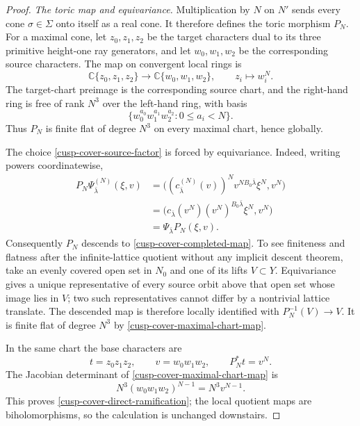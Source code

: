 \begin{proof}
\medskip\noindent
\emph{The toric map and equivariance.}
Multiplication by $N$ on $N'$ sends every cone $\sigma\in\Sigma$ onto
itself as a real cone.  It therefore defines the toric morphism $P_N$.
For a maximal cone, let $z_0,z_1,z_2$ be the target characters dual to its
three primitive height-one ray generators, and let $w_0,w_1,w_2$ be the
corresponding source characters.  The map on convergent local rings is
\begin{equation}
 \mathbb C\{z_0,z_1,z_2\}\longrightarrow
\mathbb C\{w_0,w_1,w_2\},\qquad z_i\longmapsto w_i^N.
 \label{cusp-cover-maximal-chart-map}
\end{equation}
The target-chart preimage is the corresponding source chart, and the
right-hand ring is free of rank $N^3$ over the left-hand ring, with basis
\[
 \{w_0^{a_0}w_1^{a_1}w_2^{a_2}:0\le a_i<N\}.
\]
Thus $P_N$ is finite flat of degree $N^3$ on every maximal chart, hence
globally.

The choice \eqref{cusp-cover-source-factor} is forced by equivariance.
Indeed, writing powers coordinatewise,
\begin{align}
 P_N\Psi^{(N)}_{\bar\lambda}(\xi,v)
 &=\bigl((c^{(N)}_{\bar\lambda}(v))^N
          v^{NB_0\bar\lambda}\xi^N,v^N\bigr)\\
 &=\bigl(c_{\bar\lambda}(v^N)
          (v^N)^{B_0\bar\lambda}\xi^N,v^N\bigr)\\
 &=\Psi_{\bar\lambda}P_N(\xi,v).
 \label{cusp-cover-equivariance-computation}
\end{align}
Consequently $P_N$ descends to \eqref{cusp-cover-completed-map}.  To see
finiteness and flatness after the infinite-lattice quotient without any
implicit descent theorem, take an evenly covered open set in $N_0$ and
one of its lifts $V\subset Y$.  Equivariance gives a unique representative
of every source orbit above that open set whose image lies in $V$; two
such representatives cannot differ by a nontrivial lattice translate.
The descended map is therefore locally identified with
$P_N^{-1}(V)\to V$.  It is finite flat of degree $N^3$ by
\eqref{cusp-cover-maximal-chart-map}.

In the same chart the base characters are
\[
 t=z_0z_1z_2,\qquad v=w_0w_1w_2,\qquad P_N^*t=v^N.
\]
The Jacobian determinant of \eqref{cusp-cover-maximal-chart-map} is
\[
 N^3(w_0w_1w_2)^{N-1}=N^3v^{N-1}.
\]
This proves \eqref{cusp-cover-direct-ramification}; the local quotient
maps are biholomorphisms, so the calculation is unchanged downstairs.


\end{proof}

